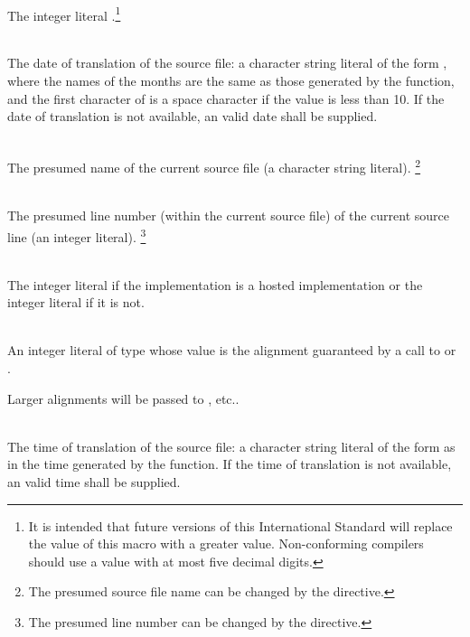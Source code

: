 \begin{description}

%
\item {}\\
The integer literal \tcode{\cppver}.\footnote{It is intended that future
versions of this International Standard will
replace the value of this macro with a greater value.
Non-conforming compilers should use a value with at most
five decimal digits.}

%
\item {}\\
The date of translation of the source file:
a character string literal of the form
,
where the names of the months are the same as those generated
by the
function,
and the first character of
is a space character if the value is less than 10.
If the date of translation is not available,
an  valid date
shall be supplied.

%
\item {}\\
The presumed name of the current source file (a character string
literal).%
\footnote{The presumed source file name can be changed by the  directive.}

%
\item {}\\
The presumed line number (within the current source file) of the current source line
(an integer literal).%
\footnote{The presumed line number can be changed by the  directive.}

%
\item {}\\
The integer literal  if the implementation is a hosted
implementation or the integer literal  if it is not.

%
\item {}\\
An integer literal of type 
whose value is the alignment guaranteed
by a call to 
or .
\begin{note}
Larger alignments will be passed to
, etc..
\end{note}

%
\item {}\\
The time of translation of the source file:
a character string literal of the form
as in the time generated by the
function.
If the time of translation is not available,
an  valid time shall be supplied.
\end{description}

